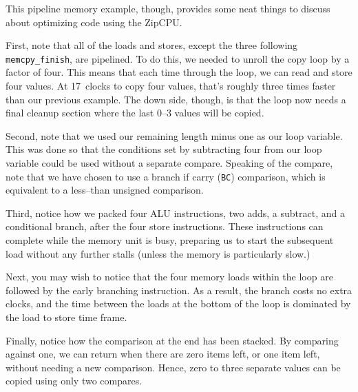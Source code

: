 \documentclass{gqtekspec}
\begin{document}
This pipeline memory example, though, provides some neat things to discuss
about optimizing code using the ZipCPU.

First, note that all of the loads and stores, except the three following
{\tt memcpy\_finish}, are pipelined.  To do this, we needed to unroll the
copy loop by a factor of four.  This means that each time through the loop,
we can read and store four values.  At 17~clocks to copy four values, that's
roughly three times faster than our previous example.  The down side, though,
is that the loop now needs a final cleanup section where the last 0--3 values
will be copied.

Second, note that we used our remaining length minus one as our loop variable.
This was done so that the conditions set by subtracting four from our loop
variable could be used without a separate compare.  Speaking of the compare,
note that we have chosen to use a branch if carry ({\tt BC}) comparison, which
is equivalent to a less--than unsigned comparison. 

Third, notice how we packed four ALU instructions, two adds, a subtract, and a
conditional branch, after the four store instructions.  These instructions can
complete while the memory unit is busy, preparing us to start the subsequent
load without any further stalls (unless the memory is particularly slow.)

Next, you may wish to notice that the four memory loads within the loop are
followed by the early branching instruction.  As a result, the branch costs
no extra clocks, and the time between the loads at the bottom of the loop
is dominated by the load to store time frame.

Finally, notice how the comparison at the end has been stacked.  By comparing
against one, we can return when there are zero items left, or one item left,
without needing a new comparison.  Hence, zero to three separate values can be 
copied using only two compares.
\end{document}
